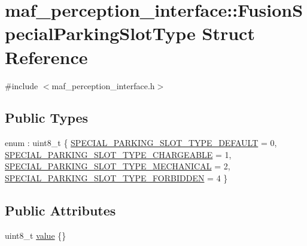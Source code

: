 \hypertarget{structmaf__perception__interface_1_1FusionSpecialParkingSlotType}{}\section{maf\+\_\+perception\+\_\+interface\+:\+:Fusion\+Special\+Parking\+Slot\+Type Struct Reference}
\label{structmaf__perception__interface_1_1FusionSpecialParkingSlotType}


{\ttfamily \#include $<$maf\+\_\+perception\+\_\+interface.\+h$>$}

\subsection*{Public Types}
\begin{DoxyCompactItemize}
\item 
enum \+: uint8\+\_\+t \{ \hyperlink{structmaf__perception__interface_1_1FusionSpecialParkingSlotType_a28101b4348c3843f985e980a4316742bac4b414273a58b333f96d659bdaf32efe}{S\+P\+E\+C\+I\+A\+L\+\_\+\+P\+A\+R\+K\+I\+N\+G\+\_\+\+S\+L\+O\+T\+\_\+\+T\+Y\+P\+E\+\_\+\+D\+E\+F\+A\+U\+LT} = 0, 
\hyperlink{structmaf__perception__interface_1_1FusionSpecialParkingSlotType_a28101b4348c3843f985e980a4316742ba291a99999eea29f568057dddfe029c32}{S\+P\+E\+C\+I\+A\+L\+\_\+\+P\+A\+R\+K\+I\+N\+G\+\_\+\+S\+L\+O\+T\+\_\+\+T\+Y\+P\+E\+\_\+\+C\+H\+A\+R\+G\+E\+A\+B\+LE} = 1, 
\hyperlink{structmaf__perception__interface_1_1FusionSpecialParkingSlotType_a28101b4348c3843f985e980a4316742baa45ba74a122c3442549d444e9a51c86a}{S\+P\+E\+C\+I\+A\+L\+\_\+\+P\+A\+R\+K\+I\+N\+G\+\_\+\+S\+L\+O\+T\+\_\+\+T\+Y\+P\+E\+\_\+\+M\+E\+C\+H\+A\+N\+I\+C\+AL} = 2, 
\hyperlink{structmaf__perception__interface_1_1FusionSpecialParkingSlotType_a28101b4348c3843f985e980a4316742ba5c2798c09effb7dbe34435e8565d681d}{S\+P\+E\+C\+I\+A\+L\+\_\+\+P\+A\+R\+K\+I\+N\+G\+\_\+\+S\+L\+O\+T\+\_\+\+T\+Y\+P\+E\+\_\+\+F\+O\+R\+B\+I\+D\+D\+EN} = 4
 \}
\end{DoxyCompactItemize}
\subsection*{Public Attributes}
\begin{DoxyCompactItemize}
\item 
uint8\+\_\+t \hyperlink{structmaf__perception__interface_1_1FusionSpecialParkingSlotType_ad05ce6cfe5691589753230c479c6172f}{value} \{\}
\end{DoxyCompactItemize}


